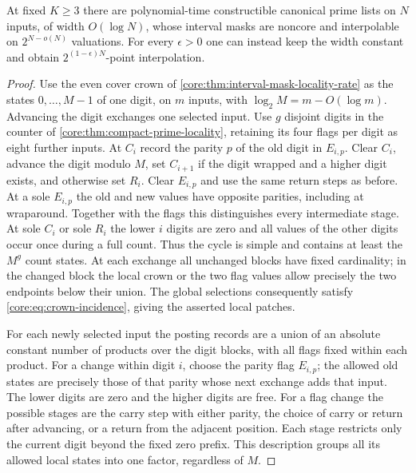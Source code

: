 \begin{corollary}
\label{core:cor:compact-locality-rate}
At fixed $K\ge3$ there are polynomial-time constructible canonical
prime lists on $N$ inputs, of width $O(\log N)$, whose interval masks
are noncore and interpolable on $2^{N-o(N)}$ valuations. For every
$\epsilon>0$ one can instead keep the width constant and obtain
$2^{(1-\epsilon)N}$-point interpolation.
\end{corollary}
\begin{proof}
Use the even cover crown of \cref{core:thm:interval-mask-locality-rate}
as the states $0,\ldots,M-1$ of one digit, on $m$ inputs, with
$\log_2 M=m-O(\log m)$. Advancing the digit exchanges one selected
input. Use $g$ disjoint digits in the counter of
\cref{core:thm:compact-prime-locality}, retaining its four flags per
digit as eight further inputs. At $C_i$ record the parity $p$ of the
old digit in $E_{i,p}$. Clear $C_i$, advance the digit modulo $M$,
set $C_{i+1}$ if the digit wrapped and a higher digit exists, and
otherwise set $R_i$. Clear $E_{i,p}$ and use the same return steps
as before. At a sole $E_{i,p}$ the old and new values have opposite
parities, including at wraparound. Together with the flags this
distinguishes every intermediate stage. At sole $C_i$ or sole $R_i$
the lower $i$ digits are zero and all values of the other digits
occur once during a full count. Thus the cycle is simple and contains
at least the $M^g$ count states. At each exchange all unchanged
blocks have fixed cardinality; in the changed block the local crown
or the two flag values allow precisely the two endpoints below their
union. The global selections consequently satisfy
\eqref{core:eq:crown-incidence}, giving the asserted local patches.

For each newly selected input the posting records are a union of
an absolute constant number of products over the digit blocks,
with all flags fixed within each product. For a change within
digit $i$, choose the parity flag $E_{i,p}$; the allowed old states
are precisely those of that parity whose next exchange adds that
input. The lower digits are zero and the higher digits are free.
For a flag change the possible stages are the carry step with either
parity, the choice of carry or return after advancing, or a return
from the adjacent position. Each stage restricts only the current
digit beyond the fixed zero prefix. This description groups all its
allowed local states into one factor, regardless of $M$.


\end{proof}
